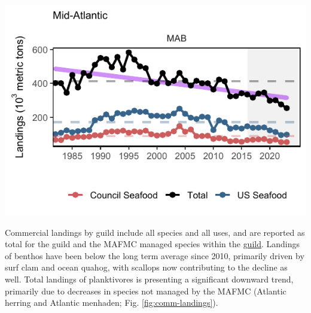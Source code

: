 \documentclass[
  10pt,
]{article}
\let\origfigure\figure
\let\endorigfigure\endfigure
\renewenvironment{figure}[1][2] {
    \expandafter\origfigure\expandafter[H]
} {
    \endorigfigure
}
\begin{document}
\begin{figure}

{\centering \includegraphics{midatlantic_files/figure-latex/total-landings-1} 

}

\caption{Total commercial landings (black), total U.S. seafood landings (blue), and Mid-Atlantic managed U.S. seafood landings (red), with significant decline (purple) in total landings.}\label{fig:total-landings}
\end{figure}

Commercial landings by guild include all species and all uses, and are reported as total for the guild and the MAFMC managed species within the \href{https://noaa-edab.github.io/catalog/species_groupings.html}{guild}. Landings of benthos have been below the long term average since 2010, primarily driven by surf clam and ocean quahog, with scallops now contributing to the decline as well. Total landings of planktivores is presenting a significant downward trend, primarily due to decreases in species not managed by the MAFMC (Atlantic herring and Atlantic menhaden; Fig. \ref{fig:comm-landings}).
\end{document}
